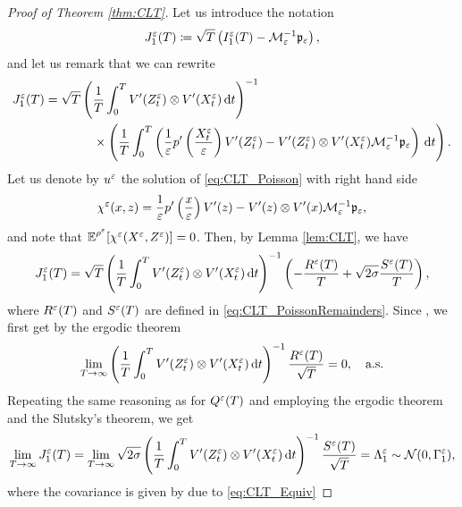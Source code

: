 \documentclass[10pt]{article}
\begin{document}
\begin{proof}[Proof of Theorem \ref{thm:CLT}]
	 Let us introduce the notation
	\begin{equation}
	J_1^\varepsilon(T) \coloneqq \sqrt{T}\left( I_1^\varepsilon(T) - \mathcal M_\varepsilon^{-1} \mathfrak p_\varepsilon\right),
	\end{equation}
	and let us remark that we can rewrite
	\begin{equation} \label{eq:decomposition_first_term}
	\begin{aligned}
	J_1^\varepsilon(T) = \sqrt{T} &\left(\frac1T \int_0^T V'(Z^\varepsilon_t) \otimes V'(X^\varepsilon_t) \,\mathrm{d} t\right)^{-1}\\
		&\quad \times \left(\frac1T \int_0^T \left( \frac{1}{\varepsilon} p' \left ( \frac{X^\varepsilon_t}{\varepsilon} \right ) V'(Z^\varepsilon_t)	- V'(Z^\varepsilon_t) \otimes V'(X^\varepsilon_t) \mathcal M_\varepsilon^{-1} \mathfrak p_\varepsilon \right) \,\mathrm{d} t	 \right).
	\end{aligned}
	\end{equation}
	Let us denote by $u^\varepsilon$ the solution of \eqref{eq:CLT_Poisson} with right hand side
	\begin{equation}
	\chi^\varepsilon(x, z) = \frac 1 {\varepsilon} p' \left ( \frac x {\varepsilon} \right ) V'(z) - V'(z) \otimes V'(x) \mathcal M_\varepsilon^{-1} \mathfrak p_\varepsilon,
	\end{equation}
	and note that $\operatorname{\mathbb{E}}^{\rho^\varepsilon}[\chi^\varepsilon(X^\varepsilon,Z^\varepsilon)] = 0$. Then, by Lemma \ref{lem:CLT}, we have
	\begin{equation}
	J_1^\varepsilon(T)= \sqrt{T} \left(\frac1T \int_0^T V'(Z^\varepsilon_t) \otimes V'(X^\varepsilon_t) \,\mathrm{d} t\right)^{-1} \left( -\frac{R^\varepsilon(T)}{T} + \sqrt{2\sigma}\frac{S^\varepsilon(T)}{T} \right),
	\end{equation}
	where $R^\varepsilon(T)$ and $S^\varepsilon(T)$ are defined in \eqref{eq:CLT_PoissonRemainders}. Since , we first get by the ergodic theorem
	\begin{equation}
	\lim_{T \to \infty} \left(\frac1T \int_0^T V'(Z^\varepsilon_t) \otimes V'(X^\varepsilon_t) \,\mathrm{d} t\right)^{-1} \frac{R^\varepsilon(T)}{\sqrt{T}} = 0, \quad \text{a.s.}
	\end{equation}
	Repeating the same reasoning as for $Q^\varepsilon(T)$ and employing the ergodic theorem and the Slutsky's theorem, we get 
	\begin{equation}
	\lim_{T \to \infty} J_1^\varepsilon(T) = \lim_{T \to \infty} \sqrt{2\sigma} \left(\frac1T \int_0^T V'(Z^\varepsilon_t) \otimes V'(X^\varepsilon_t) \,\mathrm{d} t\right)^{-1} \frac{S^\varepsilon(T)}{\sqrt{T}} = \Lambda_1^\varepsilon \sim \mathcal N(0, \Gamma_1^\varepsilon),
	\end{equation}
	where the covariance is given by due to \eqref{eq:CLT_Equiv}

\end{proof}
\end{document}
